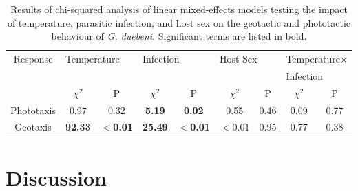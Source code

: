 {\small 
\begin{table} [H]
\caption[Results of chi-squared analysis of linear mixed-effects models testing the impact of temperature, parasitic infection, and host sex on the geotactic and phototactic behaviour of \emph{G. duebeni}.]{Results of chi-squared analysis of linear mixed-effects models testing the impact of temperature, parasitic infection, and host sex on the geotactic and phototactic behaviour of \emph{G. duebeni}. Significant terms are listed in bold.}
\begin{tabular} { c  c  c  c  c  c  c  c  c } \toprule
Response & \multicolumn{2}{l}{Temperature} & \multicolumn{2}{l}{Infection} & \multicolumn{2}{l}{Host Sex} & \multicolumn{2}{l}{Temperature$\times$} \\ 
                 &        &             &        &                &            &        &             \multicolumn{2}{l}{Infection}            \\
                  & $\chi^2$         & P                  & $\chi^2$       & P                  & $\chi^2$                 & P       & $\chi^2$               & P               \\ \midrule
Phototaxis        & 0.97       & 0.32               & \textbf{5.19}     & \textbf{0.02}               & 0.55               & 0.46    & 0.09             & 0.77            \\
Geotaxis          &\textbf{92.33}      &\textbf{$<$0.01}     & \textbf{25.49}    & \textbf{$<$0.01}   & $<$0.01    & 0.95    & 0.77             & 0.38  \\    \bottomrule    
\end{tabular}
\label{tab:taxistab}
\end{table}
}


\section{Discussion}

